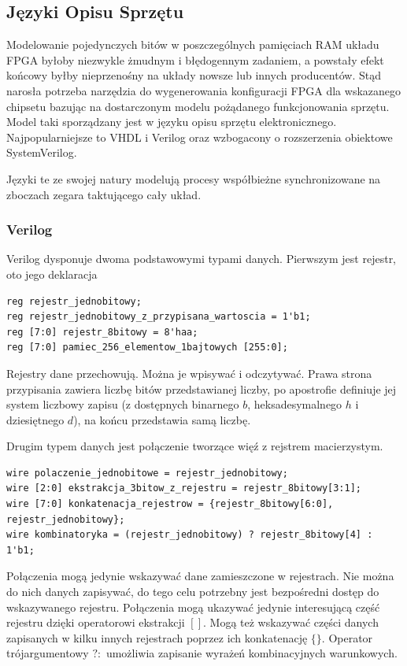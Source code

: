 \documentclass[a4paper,12pt]{article}
\begin{document}
\subsection{Języki Opisu Sprzętu}

Modelowanie pojedynczych bitów w poszczególnych pamięciach RAM układu FPGA byłoby niezwykle żmudnym i błędogennym zadaniem, a powstały efekt końcowy byłby nieprzenośny na układy nowsze lub innych producentów. Stąd narosła potrzeba narzędzia do wygenerowania konfiguracji FPGA dla wskazanego chipsetu bazując na dostarczonym modelu pożądanego funkcjonowania sprzętu. Model taki sporządzany jest w języku opisu sprzętu elektronicznego. Najpopularniejsze to VHDL i Verilog oraz wzbogacony o rozszerzenia obiektowe SystemVerilog.

Języki te ze swojej natury modelują procesy współbieżne synchronizowane na zboczach zegara taktującego cały układ.

\subsubsection{Verilog}

Verilog dysponuje dwoma podstawowymi typami danych. Pierwszym jest rejestr, oto jego deklaracja
\begin{lstlisting}[label=reg,caption=Rejestr]
reg rejestr_jednobitowy;
reg rejestr_jednobitowy_z_przypisana_wartoscia = 1'b1;
reg [7:0] rejestr_8bitowy = 8'haa;
reg [7:0] pamiec_256_elementow_1bajtowych [255:0];
\end{lstlisting}
Rejestry dane przechowują. Można je wpisywać i odczytywać. Prawa strona przypisania zawiera liczbę bitów przedstawianej liczby, po apostrofie definiuje jej system liczbowy zapisu (z dostępnych binarnego $b$, heksadesymalnego $h$ i dziesiętnego $d$), na końcu przedstawia samą liczbę.

Drugim typem danych jest połączenie tworzące więź z rejstrem macierzystym.
\begin{lstlisting}[label=reg,caption=Polaczenie]
wire polaczenie_jednobitowe = rejestr_jednobitowy;
wire [2:0] ekstrakcja_3bitow_z_rejestru = rejestr_8bitowy[3:1];
wire [7:0] konkatenacja_rejestrow = {rejestr_8bitowy[6:0], rejestr_jednobitowy};
wire kombinatoryka = (rejestr_jednobitowy) ? rejestr_8bitowy[4] : 1'b1;
\end{lstlisting}
Połączenia mogą jedynie wskazywać dane zamieszczone w rejestrach. Nie można do nich danych zapisywać, do tego celu potrzebny jest bezpośredni dostęp do wskazywanego rejestru. Połączenia mogą ukazywać jedynie interesującą część rejestru dzięki operatorowi ekstrakcji $[ ]$. Mogą też wskazywać części danych zapisanych w kilku innych rejestrach poprzez ich konkatenację $\{\}$. Operator trójargumentowy $? :$ umożliwia zapisanie wyrażeń kombinacyjnych warunkowych.
\end{document}
